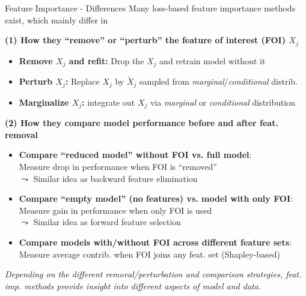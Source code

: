 \documentclass[10pt,compress,t,notes=noshow, xcolor=table]{beamer}
\begin{document}
\begin{frame}{Feature Importance - Differences }
Many loss-based feature importance methods exist, which mainly differ in

\medskip

\textbf{(1) How they ``remove'' or ``perturb'' the feature of interest (FOI) $X_j$}
\begin{itemize}
  \item \textbf{Remove $X_j$ and refit:} Drop the $X_j$ and retrain model without it %
  \item \textbf{Perturb $X_j$:} Replace $X_j$ by $\tilde X_j$ sampled from  
        \textit{marginal}/\textit{conditional} distrib. %
  \item \textbf{Marginalize $X_j$:} integrate out $X_j$ via  
        \textit{marginal} or \textit{conditional} distribution %
\end{itemize}

\pause\medskip

\textbf{(2) How they compare model performance before and after feat. removal}
\begin{itemize}
     \item \textbf{Compare ``reduced model'' without FOI vs. full model}: \\
     Measure drop in performance when FOI is ``removed'' \\
    $\leadsto$ Similar idea as backward feature elimination  %
    \item \textbf{Compare ``empty model'' (no features) vs. model with only FOI}: \\
    Measure gain in performance when only FOI is used \\
    $\leadsto$ Similar idea as forward feature selection %
    \item \textbf{Compare models with/without FOI across different feature sets}: \\
    Measure average contrib. when FOI joins any feat. set (Shapley-based) %
\end{itemize}

\pause \medskip

\textit{Depending on the different removal/perturbation and comparison strategies, feat. imp. methods provide insight into different aspects of model and data.}
\end{frame}
\end{document}
